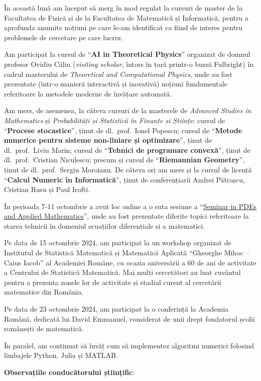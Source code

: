 
\makereportpreamble

În această lună am început să merg în mod regulat la cursuri de master de la Facultatea de Fizică și de la Facultatea de Matematică și Informatică, pentru a aprofunda anumite noțiuni pe care le-am identificat ca fiind de interes pentru problemele de cercetare pe care lucrez.

Am participat la cursul de ``\textbf{AI in Theoretical Physics}'' organizat de domnul profesor Ovidiu Călin (\emph{visiting scholar}, întors în țară printr-o bursă Fulbright) în cadrul masterului de \emph{Theoretical and Computational Physics}, unde au fost prezentate (într-o manieră interactivă și inovativă) noțiuni fundamentale referitoare la metodele moderne de învățare automată.

Am mers, de asemenea, la câteva cursuri de la masterele de \emph{Advanced Studies in Mathematics} și \emph{Probabilități și Statistică în Finanțe și Științe}: cursul de ``\textbf{Procese stocastice}'', ținut de dl.~prof.~Ionel Popescu; cursul de ``\textbf{Metode numerice pentru sisteme non-liniare și optimizare}'', ținut de dl.~prof.~Liviu Marin; cursul de ``\textbf{Tehnici de programare convexă}'', ținut de dl.~prof.~Cristian Niculescu; precum și cursul de ``\textbf{Riemannian Geometry}'', ținut de dl.~prof.~Sergiu Moroianu. De câteva ori am mers și la cursul de licență ``\textbf{Calcul Numeric în Informatică}'', ținut de conferențiarii Andrei Pătrașcu, Cristian Rusu și Paul Irofti.

În perioada 7-11 octombrie a avut loc online a o suta sesiune a ``\href{https://edpemaplicada.uff.br/wp-content/uploads/sites/308/2024/10/book_of_abstracts_SPDEAM24-1.pdf}{Seminar in PDEs and Applied Mathematics}'', unde au fost prezentate diferite topici referitoare la starea tehnicii în domeniul ecuațiilor diferențiale și a matematici.

Pe data de 15 octombrie 2024, am participat la un workshop organizat de Institutul de Statistică Matematică și Matematică Aplicată ``Gheorghe Mihoc -- Caius Iacob'' al Academiei Române, cu ocazia aniversării a 60 de ani de activitate a Centrului de Statistică Matematică. Mai mulți cercetători au luat cuvântul pentru a prezenta zonele lor de activitate și stadiul curent al cercetării matematice din România.

Pe data de 23 octombrie 2024, am participat la o conferință la Academia Română, dedicată lui David Emmanuel, considerat de unii drept fondatorul școlii românești de matematică.

În paralel, am continuat să învăț cum să implementez algoritmi numerici folosind limbajele Python, Julia și MATLAB.

\vspace{0.5em}

\textbf{Observațiile conducătorului științific}:

\vspace{3em}

